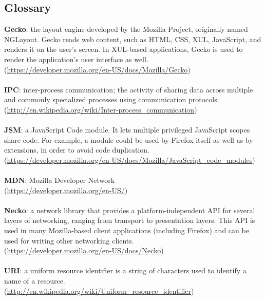 \documentclass[12pt]{article}
\begin{document}
\subsection{Glossary}
\textbf{Gecko}: the layout engine developed by the Mozilla Project, originally named NGLayout. Gecko reads web content, such as HTML, CSS, XUL, JavaScript, and renders it on the user's screen. In XUL-based applications, Gecko is used to render the application's user interface as well.\\(\href{https://developer.mozilla.org/en-US/docs/Mozilla/Gecko}{https://developer.mozilla.org/en-US/docs/Mozilla/Gecko})
\\\\
\textbf{IPC}: inter-process communication; the activity of sharing data across multiple and commonly specialized processes using communication protocols.\\(\href{http://en.wikipedia.org/wiki/Inter-process_communication}{http://en.wikipedia.org/wiki/Inter-process\_communication})
\\\\
\textbf{JSM}: a JavaScript Code module. It lets multiple privileged JavaScript scopes share code. For example, a module could be used by Firefox itself as well as by extensions, in order to avoid code duplication.\\(\href{https://developer.mozilla.org/en-US/docs/Mozilla/JavaScript_code_modules}{https://developer.mozilla.org/en-US/docs/Mozilla/JavaScript\_code\_modules})
\\\\
\textbf{MDN}: Mozilla Developer Network\\(\href{https://developer.mozilla.org/en-US/}{https://developer.mozilla.org/en-US/})
\\\\
\textbf{Necko}: a network library that provides a platform-independent API for several layers of networking, ranging from transport to presentation layers. This API is used in many Mozilla-based client applications (including Firefox) and can be used for writing other networking clients.\\(\href{https://developer.mozilla.org/en-US/docs/Necko}{https://developer.mozilla.org/en-US/docs/Necko})
\\\\
\textbf{URI}: a uniform resource identifier is a string of characters used to identify a name of a resource.\\(\href{http://en.wikipedia.org/wiki/Uniform_resource_identifier}{http://en.wikipedia.org/wiki/Uniform\_resource\_identifier})
\end{document}

